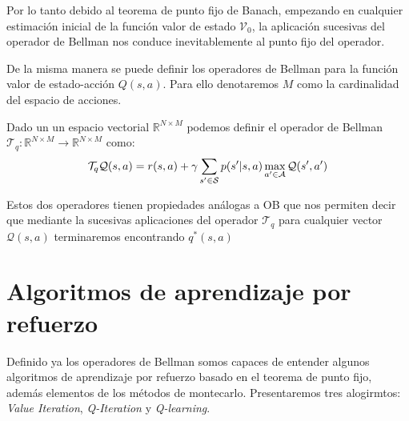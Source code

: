 Por lo tanto debido al teorema de punto fijo de Banach, empezando en cualquier estimación inicial de la función valor de estado $\mathcal{V}_0$, la aplicación sucesivas del operador de Bellman nos conduce inevitablemente al punto fijo del operador. \newline


De la misma manera se puede definir los operadores de Bellman para la función valor de estado-acción $Q(s,a)$. Para ello denotaremos $M$ como la cardinalidad del espacio de acciones.



\begin{defi}
    Dado un un espacio vectorial $\mathbb{R}^{N\times M}$ podemos definir el operador de Bellman $\mathcal{T}_q:\mathbb{R}^{N\times M} \rightarrow \mathbb{R}^{N\times M}$ como:
    \begin{gather}
        \mathcal{T}_q \mathcal{Q}(s,a) =  r(s,a) + \gamma \sum_{s' \in \mathcal{S}} p(s'|s,a) \max_{a'\in\mathcal{A}} \mathcal{Q}(s',a')
    \end{gather}
\end{defi}

Estos dos operadores tienen propiedades análogas a OB que nos permiten decir que mediante la sucesivas aplicaciones del operador $\mathcal{T}_q$ para cualquier vector $\mathcal{Q}(s,a)$ terminaremos encontrando $q^*(s,a)$



\section{Algoritmos de aprendizaje por refuerzo}

Definido ya los operadores de Bellman somos capaces de entender algunos algoritmos de aprendizaje por refuerzo basado en el teorema de punto fijo, además elementos de los métodos de montecarlo. Presentaremos tres alogirmtos: \emph{Value Iteration}, \emph{Q-Iteration} y \emph{Q-learning}.

